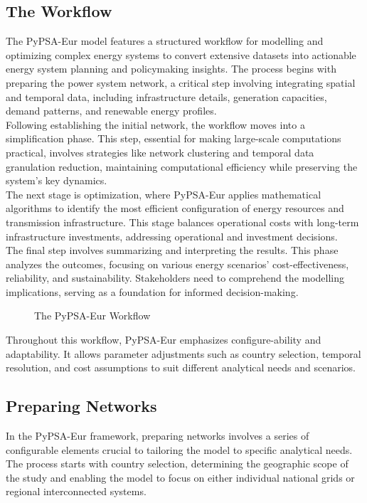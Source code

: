 \subsection{The Workflow} 
The PyPSA-Eur model features a structured workflow for modelling and optimizing complex energy systems to convert extensive datasets into actionable energy system planning and policymaking insights. The process begins with preparing the power system network, a critical step involving integrating spatial and temporal data, including infrastructure details, generation capacities, demand patterns, and renewable energy profiles.\\

Following establishing the initial network, the workflow moves into a simplification phase. This step, essential for making large-scale computations practical, involves strategies like network clustering and temporal data granulation reduction, maintaining computational efficiency while preserving the system's key dynamics.\\

The next stage is optimization, where PyPSA-Eur applies mathematical algorithms to identify the most efficient configuration of energy resources and transmission infrastructure. This stage balances operational costs with long-term infrastructure investments, addressing operational and investment decisions.\\

The final step involves summarizing and interpreting the results. This phase analyzes the outcomes, focusing on various energy scenarios' cost-effectiveness, reliability, and sustainability. Stakeholders need to comprehend the modelling implications, serving as a foundation for informed decision-making.\\

\begin{figure}[H]
\centering

\caption{The PyPSA-Eur Workflow}
\label{fig:pypsa-workflow}
\end{figure}

Throughout this workflow, PyPSA-Eur emphasizes configure-ability and adaptability. It allows parameter adjustments such as country selection, temporal resolution, and cost assumptions to suit different analytical needs and scenarios.





\subsection{Preparing Networks}
In the PyPSA-Eur framework, preparing networks involves a series of configurable elements crucial to tailoring the model to specific analytical needs. The process starts with country selection, determining the geographic scope of the study and enabling the model to focus on either individual national grids or regional interconnected systems.\\

